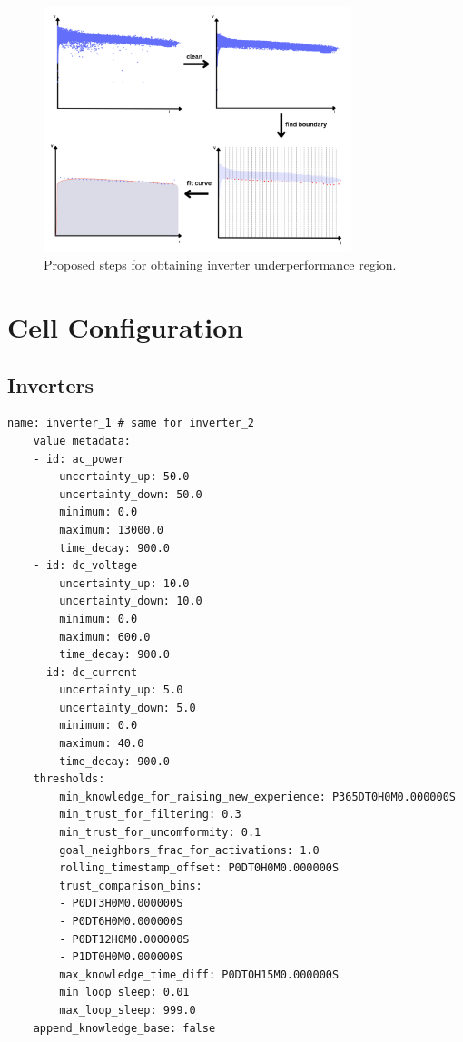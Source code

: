 \begin{figure}[h!]
    \centering
    \includegraphics[width=0.8\textwidth]{figures/chapter5/algorithm/plugin_steps.pdf}
    \caption{Proposed steps for obtaining inverter underperformance region.}
    \label{fig:pluginsteps}
\end{figure}

\FloatBarrier

\section{Cell Configuration}  \label{ap2:cellconfig}

\subsection{Inverters}

\begin{lstlisting}[style=yaml]
    name: inverter_1 # same for inverter_2
    value_metadata:
    - id: ac_power
        uncertainty_up: 50.0
        uncertainty_down: 50.0
        minimum: 0.0
        maximum: 13000.0
        time_decay: 900.0
    - id: dc_voltage
        uncertainty_up: 10.0
        uncertainty_down: 10.0
        minimum: 0.0
        maximum: 600.0
        time_decay: 900.0
    - id: dc_current
        uncertainty_up: 5.0
        uncertainty_down: 5.0
        minimum: 0.0
        maximum: 40.0
        time_decay: 900.0
    thresholds:
        min_knowledge_for_raising_new_experience: P365DT0H0M0.000000S
        min_trust_for_filtering: 0.3
        min_trust_for_uncomformity: 0.1
        goal_neighbors_frac_for_activations: 1.0
        rolling_timestamp_offset: P0DT0H0M0.000000S
        trust_comparison_bins:
        - P0DT3H0M0.000000S
        - P0DT6H0M0.000000S
        - P0DT12H0M0.000000S
        - P1DT0H0M0.000000S
        max_knowledge_time_diff: P0DT0H15M0.000000S
        min_loop_sleep: 0.01
        max_loop_sleep: 999.0
    append_knowledge_base: false
\end{lstlisting}

